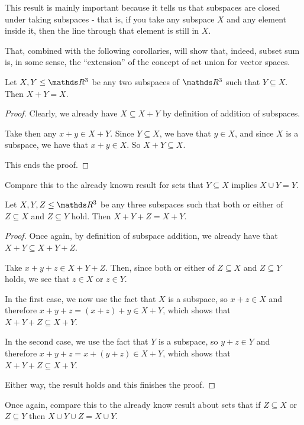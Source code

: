This result is mainly important because it tells us that subspaces are closed under taking subspaces - that is, if you take any subspace $X$ and any element inside it, then the line through that element is still in $X$.

That, combined with the following corollaries, will show that, indeed, subset sum is, in some sense, the ``extension'' of the concept of set union for vector spaces.

\begin{cor}
	Let $X,Y\leq \R^3$ be any two subspaces of $\R^3$ such that $Y\subseteq X$. Then $X+Y=X$.
\end{cor}
\begin{proof}
	Clearly, we already have $X\subseteq X+Y$ by definition of addition of subspaces.
	
	Take then any $x+y\in X+Y$. Since $Y\subseteq X$, we have that $y\in X$, and since $X$ is a subspace, we have that $x+y\in X$. So $X+Y\subseteq X$.
	
	This ends the proof.
\end{proof}
\begin{rmk}
	Compare this to the already known result for sets that $Y\subseteq X$ implies $X\cup Y=Y$.
\end{rmk}
\begin{cor}
	Let $X,Y,Z\leq \R^3$ be any three subspaces such that both or either of $Z\subseteq X$ and $Z\subseteq Y$ hold. Then $X+Y+Z=X+Y$.
\end{cor}
\begin{proof}
	Once again, by definition of subspace addition, we already have that $X+Y\subseteq X+Y+Z$.
	
	Take $x+y+z\in X+Y+Z$. Then, since both or either of $Z\subseteq X$ and $Z\subseteq Y$ holds, we see that $z\in X$ or $z\in Y$.
	
	In the first case, we now use the fact that $X$ is a subspace, so $x+z\in X$ and therefore $x+y+z=(x+z)+y\in X+Y$, which shows that $X+Y+Z\subseteq X+Y$.
	
	In the second case, we use the fact that $Y$ is a subspace, so $y+z\in Y$ and therefore $x+y+z=x+(y+z)\in X+Y$, which shows that $X+Y+Z\subseteq X+Y$.
	
	Either way, the result holds and this finishes the proof.
\end{proof}
\begin{rmk}
	Once again, compare this to the already know result about sets that if $Z\subseteq X$ or $Z\subseteq Y$ then $X\cup Y\cup Z=X\cup Y$.
\end{rmk}

